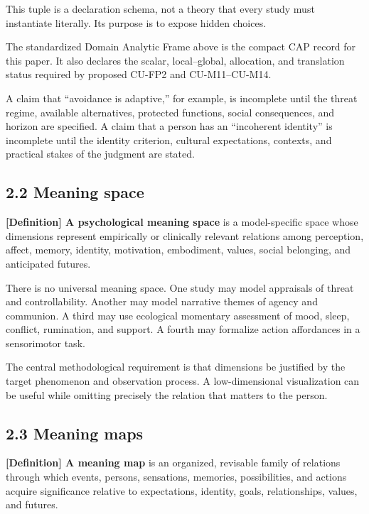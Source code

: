 \documentclass[
  11pt,
]{article}
\begin{document}
This tuple is a declaration schema, not a theory that every study must
instantiate literally. Its purpose is to expose hidden choices.

The standardized Domain Analytic Frame above is the compact CAP record
for this paper. It also declares the scalar, local--global, allocation,
and translation status required by proposed CU-FP2 and CU-M11--CU-M14.

A claim that ``avoidance is adaptive,'' for example, is incomplete until
the threat regime, available alternatives, protected functions, social
consequences, and horizon are specified. A claim that a person has an
``incoherent identity'' is incomplete until the identity criterion,
cultural expectations, contexts, and practical stakes of the judgment
are stated.

\subsection{2.2 Meaning space}\label{meaning-space}

\textbf{{[}Definition{]} A psychological meaning space} is a
model-specific space whose dimensions represent empirically or
clinically relevant relations among perception, affect, memory,
identity, motivation, embodiment, values, social belonging, and
anticipated futures.

There is no universal meaning space. One study may model appraisals of
threat and controllability. Another may model narrative themes of agency
and communion. A third may use ecological momentary assessment of mood,
sleep, conflict, rumination, and support. A fourth may formalize action
affordances in a sensorimotor task.

The central methodological requirement is that dimensions be justified
by the target phenomenon and observation process. A low-dimensional
visualization can be useful while omitting precisely the relation that
matters to the person.

\subsection{2.3 Meaning maps}\label{meaning-maps}

\textbf{{[}Definition{]} A meaning map} is an organized, revisable
family of relations through which events, persons, sensations, memories,
possibilities, and actions acquire significance relative to
expectations, identity, goals, relationships, values, and futures.
\end{document}
